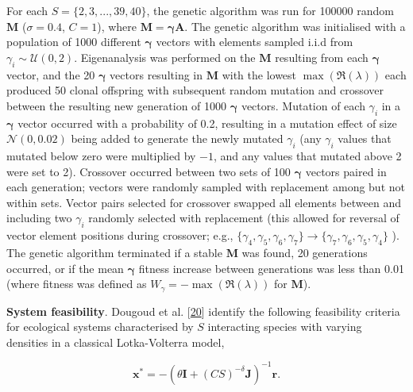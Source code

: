 \documentclass[]{article}
\begin{document}
For each \(S = \{2, 3, ..., 39, 40\}\), the genetic algorithm was run
for 100000 random \(\mathbf{M}\) (\(\sigma = 0.4\), \(C = 1\)), where
\(\mathbf{M = \gamma A}\). The genetic algorithm was initialised with a
population of 1000 different \(\mathbf{\gamma}\) vectors with elements
sampled i.i.d from \(\gamma_{i} \sim \mathcal{U}(0, 2)\). Eigenanalysis
was performed on the \(\mathbf{M}\) resulting from each
\(\mathbf{\gamma}\) vector, and the 20 \(\mathbf{\gamma}\) vectors
resulting in \(\mathbf{M}\) with the lowest
\(\max\left(\Re(\lambda)\right)\) each produced 50 clonal offspring with
subsequent random mutation and crossover between the resulting new
generation of 1000 \(\mathbf{\gamma}\) vectors. Mutation of each
\(\gamma_{i}\) in a \(\mathbf{\gamma}\) vector occurred with a
probability of 0.2, resulting in a mutation effect of size
\(\mathcal{N}(0, 0.02)\) being added to generate the newly mutated
\(\gamma_{i}\) (any \(\gamma_{i}\) values that mutated below zero were
multiplied by \(-1\), and any values that mutated above 2 were set to
2). Crossover occurred between two sets of 100 \(\mathbf{\gamma}\)
vectors paired in each generation; vectors were randomly sampled with
replacement among but not within sets. Vector pairs selected for
crossover swapped all elements between and including two \(\gamma_{i}\)
randomly selected with replacement (this allowed for reversal of vector
element positions during crossover; e.g.,
\(\{\gamma_{4}, \gamma_{5}, \gamma_{6}, \gamma_{7}\} \to \{\gamma_{7}, \gamma_{6}, \gamma_{5}, \gamma_{4}\}\)
). The genetic algorithm terminated if a stable \(\mathbf{M}\) was
found, 20 generations occurred, or if the mean \(\mathbf{\gamma}\)
fitness increase between generations was less than 0.01 (where fitness
was defined as \(W_{\gamma} = -\max\left(\Re(\lambda)\right)\) for
\(\mathbf{M}\)).

\textbf{System feasibility}. Dougoud et al.
{[}\protect\hyperlink{ref-Dougoud2018}{20}{]} identify the following
feasibility criteria for ecological systems characterised by \(S\)
interacting species with varying densities in a classical Lotka-Volterra
model,

\[\mathbf{x^{*}} = -\left(\theta \mathbf{I} + (CS)^{-\delta}\mathbf{J} \right)^{-1}\mathbf{r}.\]
\end{document}
